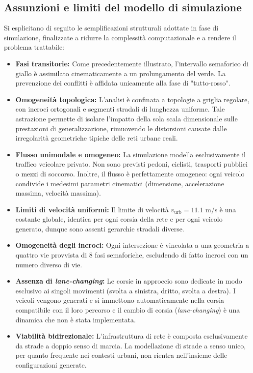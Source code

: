 \subsection{Assunzioni e limiti del modello di simulazione}
Si esplicitano di seguito le semplificazioni strutturali adottate in fase di simulazione, finalizzate a ridurre la complessità computazionale e a rendere il problema trattabile:
\begin{itemize}
  \item \textbf{Fasi transitorie:} Come precedentemente illustrato, l'intervallo semaforico di giallo è assimilato cinematicamente a un prolungamento del verde.
        La prevenzione dei conflitti è affidata unicamente alla fase di "tutto-rosso".
  \item \textbf{Omogeneità topologica:} L'analisi è confinata a topologie a griglia regolare, con incroci ortogonali e segmenti stradali di lunghezza uniforme.
        Tale astrazione permette di isolare l'impatto della sola scala dimensionale sulle prestazioni di generalizzazione, rimuovendo le distorsioni causate dalle irregolarità geometriche tipiche delle reti urbane reali.
  \item \textbf{Flusso unimodale e omogeneo:} La simulazione modella esclusivamente il traffico veicolare privato. Non sono previsti pedoni, ciclisti, trasporti pubblici o mezzi di soccorso.
        Inoltre, il flusso è perfettamente omogeneo: ogni veicolo condivide i medesimi parametri cinematici (dimensione, accelerazione massima, velocità massima).
  \item \textbf{Limiti di velocità uniformi:} Il limite di velocità $v_{\mathrm{urb}}=11.1$ m/s è una costante globale, identica per ogni corsia della rete e per ogni veicolo generato, dunque sono assenti gerarchie stradali diverse.
  \item \textbf{Omogeneità degli incroci:} Ogni intersezione è vincolata a una geometria a quattro vie provvista di 8 fasi semaforiche, escludendo di fatto incroci con un numero diverso di vie.
  \item \textbf{Assenza di \emph{lane-changing}:} Le corsie in approccio sono dedicate in modo esclusivo ai singoli movimenti (svolta a sinistra, dritto, svolta a destra).
        I veicoli vengono generati e si immettono automaticamente nella corsia compatibile con il loro percorso e il cambio di corsia (\emph{lane-changing}) è una dinamica che non è stata implementata.
  \item \textbf{Viabilità bidirezionale:} L'infrastruttura di rete è composta esclusivamente da strade a doppio senso di marcia.
        La modellazione di strade a senso unico, per quanto frequente nei contesti urbani, non rientra nell'insieme delle configurazioni generate.
\end{itemize}
